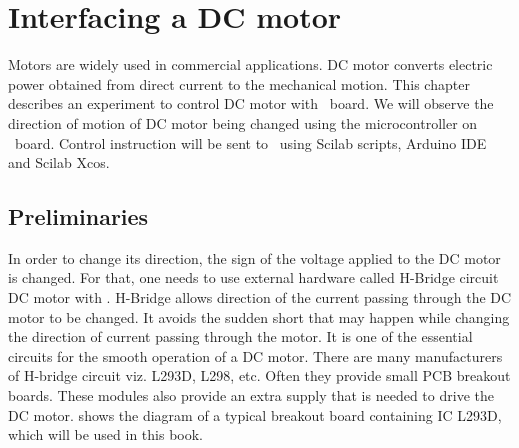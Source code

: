 \chapter {Interfacing a DC motor}
\thispagestyle{empty}
\label{dcmotor}
\newcommand{\LocDCMfig}{\Origin/user-code/dcmotor/figures}
\newcommand{\LocDCMscicode}{\Origin/user-code/dcmotor/scilab}
\newcommand{\LocDCMscibrief}[1]{{\tt \seqsplit{
    Origin/user-code/dcmotor/scilab/#1}}, 
see \fnrefp{fn:file-loc}}
\newcommand{\LocDCMardcode}{\Origin/user-code/dcmotor/arduino}
\newcommand{\LocDCMardbrief}[1]{{\tt \seqsplit{
    Origin/user-code/dcmotor/arduino/#1}}, 
see \fnrefp{fn:file-loc}}

\newcommand{\LocDCMpycode}{\Origin/user-code/dcmotor/python}
\newcommand{\LocDCMpybrief}[1]{{\tt \seqsplit{
    Origin/user-code/dcmotor/python/#1}}, 
see \fnrefp{fn:file-loc}}

\newcommand{\LocDCMjuliacode}{\Origin/user-code/dcmotor/julia}
\newcommand{\LocDCMjuliabrief}[1]{{\tt \seqsplit{
    Origin/user-code/dcmotor/julia/#1}}, 
see \fnrefp{fn:file-loc}}

\newcommand{\LocDCMOpenModelicacode}{\Origin/user-code/dcmotor/OpenModelica}  %
\newcommand{\LocDCMOpenModelicabrief}[1]{{\tt \seqsplit{%
    Origin/user-code/led/OpenModelica/#1}}, see \fnrefp{fn:file-loc}} %


Motors are widely used in commercial applications. DC motor converts
electric power obtained from direct current to the mechanical
motion. This chapter describes an experiment to control DC motor with
\arduino\ board. We will observe the direction of motion of DC motor
being changed using the microcontroller on \arduino\ board. Control
instruction will be sent to \arduino\ using Scilab scripts, Arduino IDE and Scilab Xcos.

\section{Preliminaries}
In order to change its direction, the sign of the voltage applied to
the DC motor is changed.  For that, one needs to use external hardware
called %
H-Bridge circuit DC motor with \arduino. %
H-Bridge allows direction of the current passing through the DC motor
to be changed. It avoids the sudden short that may happen while
changing the direction of current passing through the motor.  It is
one of the essential circuits for the smooth operation of a DC
motor. There are many manufacturers of H-bridge circuit viz.
%
L293D, L298, etc.  Often they provide small %
PCB breakout boards.  These modules also provide an extra supply that
is needed to drive the DC motor.   shows
the diagram of a typical breakout board containing IC L293D, which will
be used in this book. \par

